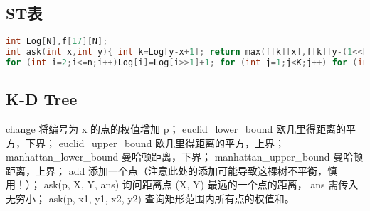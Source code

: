 \documentclass{article}
\begin{document}
\subsection{ST表}
\begin{lstlisting}[language=C++]
int Log[N],f[17][N];
int ask(int x,int y){ int k=Log[y-x+1]; return max(f[k][x],f[k][y-(1<<k)+1]); }
for (int i=2;i<=n;i++)Log[i]=Log[i>>1]+1; for (int j=1;j<K;j++) for (int i=1;i+(1<<j-1)<=n;i++) f[j][i]=max(f[j-1][i],f[j-1][i+(1<<j-1)]);
\end{lstlisting}

\subsection{K-D Tree}

 change 将编号为 x 的点的权值增加 p；
 euclid\_lower\_bound 欧几里得距离的平方，下界；
 euclid\_upper\_bound 欧几里得距离的平方，上界；
 manhattan\_lower\_bound 曼哈顿距离，下界；
 manhattan\_upper\_bound 曼哈顿距离，上界；
 add 添加一个点（注意此处的添加可能导致这棵树不平衡，慎用！）；
 ask(p, X, Y, ans) 询问距离点 (X, Y) 最远的一个点的距离， ans 需传入无穷小；
 ask(p, x1, y1, x2, y2) 查询矩形范围内所有点的权值和。
\end{document}
